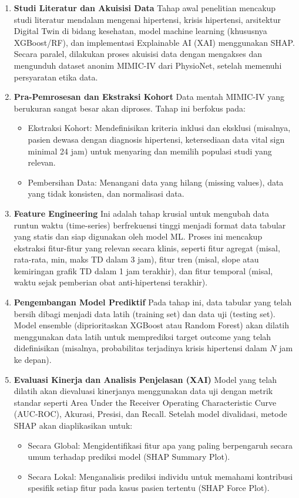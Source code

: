 \begin{enumerate}
    \item \textbf{Studi Literatur dan Akuisisi Data}
    Tahap awal penelitian mencakup studi literatur mendalam mengenai hipertensi, krisis hipertensi, arsitektur Digital Twin di bidang kesehatan, model machine learning (khususnya XGBoost/RF), dan implementasi Explainable AI (XAI) menggunakan SHAP. Secara paralel, dilakukan proses akuisisi data dengan mengakses dan mengunduh dataset anonim MIMIC-IV dari PhysioNet, setelah memenuhi persyaratan etika data.

    \item \textbf{Pra-Pemrosesan dan Ekstraksi Kohort}
    Data mentah MIMIC-IV yang berukuran sangat besar akan diproses. Tahap ini berfokus pada:
    \begin{itemize}
        \item Ekstraksi Kohort: Mendefinisikan kriteria inklusi dan eksklusi (misalnya, pasien dewasa dengan diagnosis hipertensi, ketersediaan data vital sign minimal 24 jam) untuk menyaring dan memilih populasi studi yang relevan.
        \item Pembersihan Data: Menangani data yang hilang (missing values), data yang tidak konsisten, dan normalisasi data.
    \end{itemize}

    \item \textbf{Feature Engineering}
    Ini adalah tahap krusial untuk mengubah data runtun waktu (time-series) berfrekuensi tinggi menjadi format data tabular yang statis dan siap digunakan oleh model ML. Proses ini mencakup ekstraksi fitur-fitur yang relevan secara klinis, seperti fitur agregat (misal, rata-rata, min, maks TD dalam 3 jam), fitur tren (misal, slope atau kemiringan grafik TD dalam 1 jam terakhir), dan fitur temporal (misal, waktu sejak pemberian obat anti-hipertensi terakhir).

    \item \textbf{Pengembangan Model Prediktif}
    Pada tahap ini, data tabular yang telah bersih dibagi menjadi data latih (training set) dan data uji (testing set). Model ensemble (diprioritaskan XGBoost atau Random Forest) akan dilatih menggunakan data latih untuk memprediksi target outcome yang telah didefinisikan (misalnya, probabilitas terjadinya krisis hipertensi dalam $N$ jam ke depan).

    \item \textbf{Evaluasi Kinerja dan Analisis Penjelasan (XAI)}
    Model yang telah dilatih akan dievaluasi kinerjanya menggunakan data uji dengan metrik standar seperti Area Under the Receiver Operating Characteristic Curve (AUC-ROC), Akurasi, Presisi, dan Recall. Setelah model divalidasi, metode SHAP akan diaplikasikan untuk:
    \begin{itemize}
        \item Secara Global: Mengidentifikasi fitur apa yang paling berpengaruh secara umum terhadap prediksi model (SHAP Summary Plot).
        \item Secara Lokal: Menganalisis prediksi individu untuk memahami kontribusi spesifik setiap fitur pada kasus pasien tertentu (SHAP Force Plot).
    \end{itemize}


\end{enumerate}
